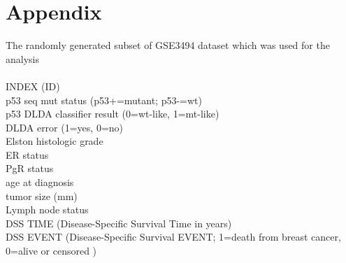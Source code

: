\documentclass{article}
\begin{document}
\section*{Appendix}
The randomly generated subset of GSE3494 dataset which was used for the analysis\\\\INDEX (ID)\\p53 seq mut status (p53+=mutant; p53-=wt)\\p53 DLDA classifier result (0=wt-like, 1=mt-like)\\DLDA error (1=yes, 0=no)\\Elston histologic grade\\ER status\\PgR status\\age at diagnosis\\tumor size (mm)\\Lymph node status\\DSS TIME (Disease-Specific Survival Time in years)\\DSS EVENT (Disease-Specific Survival EVENT; 1=death from breast cancer, 0=alive or censored )
\end{document}
